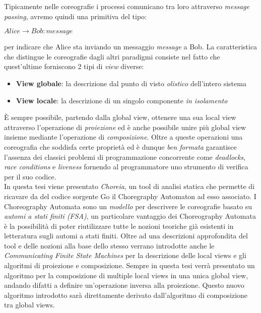 Tipicamente nelle coreografie i processi comunicano tra loro attraverso \emph{message passing}, avremo quindi una primitiva del tipo:
\begin{center}
    $Alice \rightarrow Bob : message$
\end{center}
per indicare che Alice sta inviando un messaggio \emph{message} a Bob. La caratteristica che distingue le coreografie dagli altri paradigmi consiste nel fatto che quest'ultime forniscono 2 tipi di \emph{view} diverse:
\begin{itemize}
    \item \textbf{View globale}: la descrizione dal punto di visto \emph{olistico} dell'intero sistema
    \item \textbf{View locale}: la descrizione di un singolo componente \emph{in isolamento}
\end{itemize}
È sempre possibile, partendo dalla global view, ottenere una sua local view attraverso l'operazione di \emph{proiezione} ed è anche possibile unire più global view insieme mediante l'operazione di \emph{composizione}\cite{CA_Composition}. Oltre a queste operazioni una coreografia che soddisfa certe proprietà ed è dunque \emph{ben formata} garantisce l'assenza dei classici problemi di programmazione concorrente come \emph{deadlocks}, \emph{race conditions} e \emph{liveness} fornendo al programmatore uno strumento di verifica per il suo codice.\bigskip \\
In questa tesi viene presentato \emph{Choreia}, un tool di analisi statica che permette di ricavare da del codice sorgente Go il Choregraphy Automaton ad esso associato. I Choreography Automata sono un \emph{modello} per descrivere le coreografie basato su \emph{automi a stati finiti (FSA)}, un particolare vantaggio dei Choreography Automata è la possibilità di poter riutilizzare tutte le nozioni teoriche già esistenti in letteratura sugli automi a stati finiti. Oltre ad una descrizioni approfondita del tool e delle nozioni alla base dello stesso verrano introdotte anche le \emph{Communicating Finite State Machines} per la descrizione delle local views e gli algoritmi di proiezione e composizione. Sempre in questa tesi verrà presentato un algoritmo per la composizione di multiple local views in una unica global view, andando difatti a definire un'operazione inversa alla proiezione. Questo nuovo algoritmo introdotto sarà direttamente derivato dall'algoritmo di composizione tra global views.